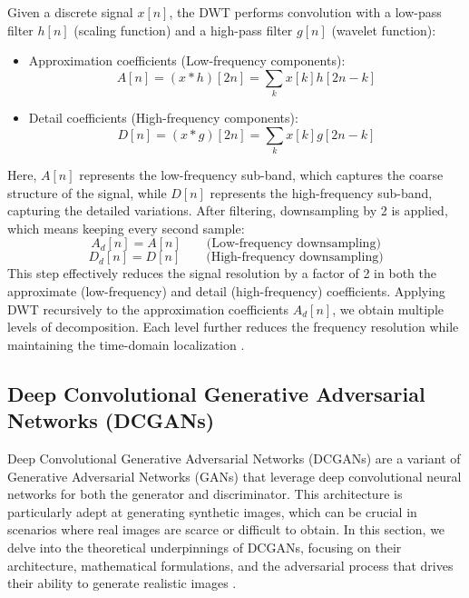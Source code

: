 Given a discrete signal $x[n]$, the DWT performs convolution with a low-pass filter $h[n]$  (scaling function) and a high-pass filter $g[n]$  (wavelet function):
\begin{itemize}
    \item Approximation coefficients (Low-frequency components):
    \begin{equation}
        A[n] = (x * h)[2n] = \sum_k x[k]h[2n-k]
    \end{equation}
    \item Detail coefficients (High-frequency components):
    \begin{equation}
        D[n] = (x * g)[2n] = \sum_k x[k]g[2n-k]
    \end{equation}
\end{itemize}
Here, $A[n]$ represents the low-frequency sub-band, which captures the coarse structure of the signal, while $D[n]$ represents the high-frequency sub-band, capturing the detailed variations. After filtering, downsampling by 2 is applied, which means keeping every second sample:
\begin{equation}
    A_d [n] = A[n] \qquad \text{(Low-frequency downsampling)}
\end{equation}
\begin{equation}
    D_d [n] = D[n] \qquad \text{(High-frequency downsampling)}
\end{equation}
This step effectively reduces the signal resolution by a factor of 2 in both the approximate (low-frequency) and detail (high-frequency) coefficients. Applying DWT recursively to the approximation coefficients $A_d [n]$, we obtain multiple levels of decomposition. Each level further reduces the frequency resolution while maintaining the time-domain localization \parencite{subasi2007eeg}.

\subsection{Deep Convolutional Generative Adversarial Networks (DCGANs)}
 
Deep Convolutional Generative Adversarial Networks (DCGANs) are a variant of Generative Adversarial Networks (GANs) that leverage deep convolutional neural networks for both the generator and discriminator. This architecture is particularly adept at generating synthetic images, which can be crucial in scenarios where real images are scarce or difficult to obtain. In this section, we delve into the theoretical underpinnings of DCGANs, focusing on their architecture, mathematical formulations, and the adversarial process that drives their ability to generate realistic images \parencite{radford2015unsupervised}. \\

